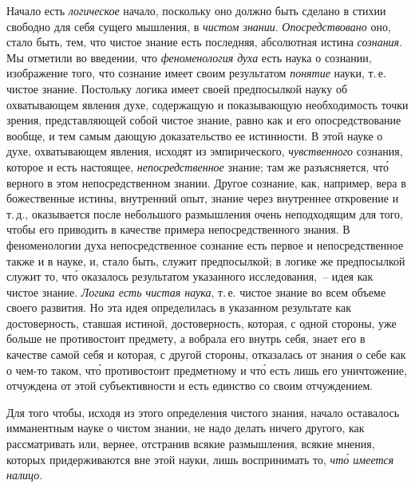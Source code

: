 Начало есть \emph{логическое} начало, поскольку оно должно
быть сделано в стихии свободно для себя сущего мышления,
в \emph{чистом знании}. \emph{Опосредствовано} оно, стало быть,
тем, что чистое знание есть последняя, абсолютная
истина \emph{сознания}. Мы отметили во введении, что \emph{феноменология
духа} есть наука о сознании, изображение
того, что сознание имеет своим результатом \emph{понятие}
науки, т.\,е. чистое знание. Постольку логика имеет своей
предпосылкой науку об охватывающем явления духе,
содержащую и показывающую необходимость точки зрения,
представляющей собой чистое знание, равно как и
его опосредствование вообще, и тем самым дающую доказательство
ее истинности. В этой науке о духе, охватывающем
явления, исходят из эмпирического, \emph{чувственного}
сознания, которое и есть настоящее, \emph{непосредственное}
знание; там же разъясняется, чт\'о верного в этом
непосредственном знании. Другое сознание, как, например,
вера в божественные истины, внутренний опыт, знание
через внутреннее откровение и т.\,д., оказывается
после небольшого размышления очень неподходящим
для того, чтобы его приводить в качестве примера непосредственного
знания. В феноменологии духа непосредственное
сознание есть первое и непосредственное также
и в науке, и, стало быть, служит предпосылкой; в логике
же предпосылкой служит то, чт\'о оказалось результатом
указанного исследования,~-- идея как чистое знание. \emph{Логика
есть чистая наука}, т.\,е. чистое знание во всем объеме
своего развития. Но эта идея определилась в указанном
результате как достоверность, ставшая истиной, достоверность,
которая, с одной стороны, уже больше не
противостоит предмету, а вобрала его внутрь себя, знает
его в качестве самой себя
и которая, с другой стороны,
отказалась от знания о себе как о чем-то таком, чт\'о противостоит
предметному и чт\'о есть лишь его уничтожение,
отчуждена от этой субъективности и есть единство со
своим отчуждением.

Для того чтобы, исходя из этого определения чистого
знания, начало оставалось имманентным науке о чистом
знании, не надо делать ничего другого, как рассматривать
или, вернее, отстранив всякие размышления, всякие
мнения, которых придерживаются вне этой науки, лишь
воспринимать то, \emph{чт\'о имеется налицо}.

